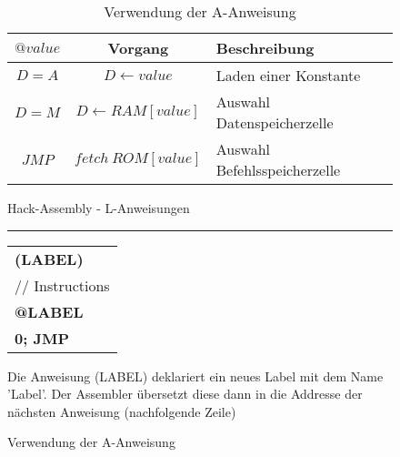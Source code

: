 \documentclass[12pt]{report}
\newcommand*\sepline{%
   \begin{center}
     \rule[1ex]{\textwidth}{.5pt}
   \end{center}}
\begin{document}
\begin{samepage}
\begin{figure}[H]
\begin{minipage}[t]{0.45\textwidth}
            \begin{table}[H]
                \caption*{Verwendung der A-Anweisung}
                \begin{tabular}{|c|c|l|}
                    \hline
                    $@value$ & Vorgang                   & Beschreibung                 \\\hline
                    $D=A$    & $D \leftarrow value$      & Laden einer Konstante        \\
                    $D=M$    & $D \leftarrow RAM[value]$ & Auswahl Datenspeicherzelle   \\
                    $JMP$    & $fetch\ ROM[value]$       & Auswahl Befehlsspeicherzelle \\ \hline
                \end{tabular}
            \end{table}

            \begin{center}
                \Huge
                Hack-Assembly - L-Anweisungen
            \end{center}
            \sepline

            \centering
            \begin{tabular}{l}
                \textbf{(LABEL)}              \\
                \hspace{10pt} // Instructions \\
                \hspace{10pt}\textbf{@LABEL}  \\
                \hspace{10pt}\textbf{0; JMP}
            \end{tabular}

            Die Anweisung (LABEL) deklariert ein neues Label mit dem Name 'Label'. Der Assembler
            übersetzt diese dann in die Addresse der nächsten Anweisung (nachfolgende Zeile)
        \end{minipage}
    \end{figure}
\end{samepage}


\pagebreak
\end{document}
